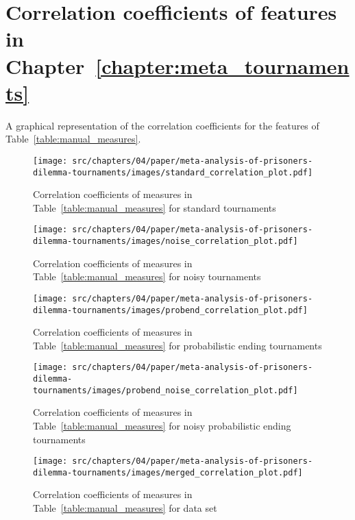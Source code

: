 \chapter{Correlation coefficients of features in Chapter~\ref{chapter:meta_tournaments}}\label{app:correlations}

A graphical representation of the correlation coefficients for the features of
Table~\ref{table:manual_measures}.

\begin{figure}[!htbp]
        \begin{center}
            \texttt{[image: src/chapters/04/paper/meta-analysis-of-prisoners-dilemma-tournaments/images/standard\_correlation\_plot.pdf]}
        \end{center}
        \caption{Correlation coefficients of measures in Table~\ref{table:manual_measures}
        for standard tournaments}
\end{figure}
\begin{figure}[!htbp]
    \begin{center}
        \texttt{[image: src/chapters/04/paper/meta-analysis-of-prisoners-dilemma-tournaments/images/noise\_correlation\_plot.pdf]}
    \end{center}
    \caption{Correlation coefficients of measures in Table~\ref{table:manual_measures}
    for noisy tournaments}
\end{figure}
\begin{figure}[!htbp]
    \begin{center}
        \texttt{[image: src/chapters/04/paper/meta-analysis-of-prisoners-dilemma-tournaments/images/probend\_correlation\_plot.pdf]}
    \end{center}
    \caption{Correlation coefficients of measures in Table~\ref{table:manual_measures}
    for probabilistic ending tournaments}
\end{figure}
\begin{figure}[!htbp]
    \begin{center}
        \texttt{[image: src/chapters/04/paper/meta-analysis-of-prisoners-dilemma-tournaments/images/probend\_noise\_correlation\_plot.pdf]}
    \end{center}
    \caption{Correlation coefficients of measures in Table~\ref{table:manual_measures}
    for noisy probabilistic ending tournaments}
\end{figure}
\begin{figure}[!htbp]
    \begin{center}
        \texttt{[image: src/chapters/04/paper/meta-analysis-of-prisoners-dilemma-tournaments/images/merged\_correlation\_plot.pdf]}
    \end{center}
    \caption{Correlation coefficients of measures in Table~\ref{table:manual_measures}
    for data set}
\end{figure}
